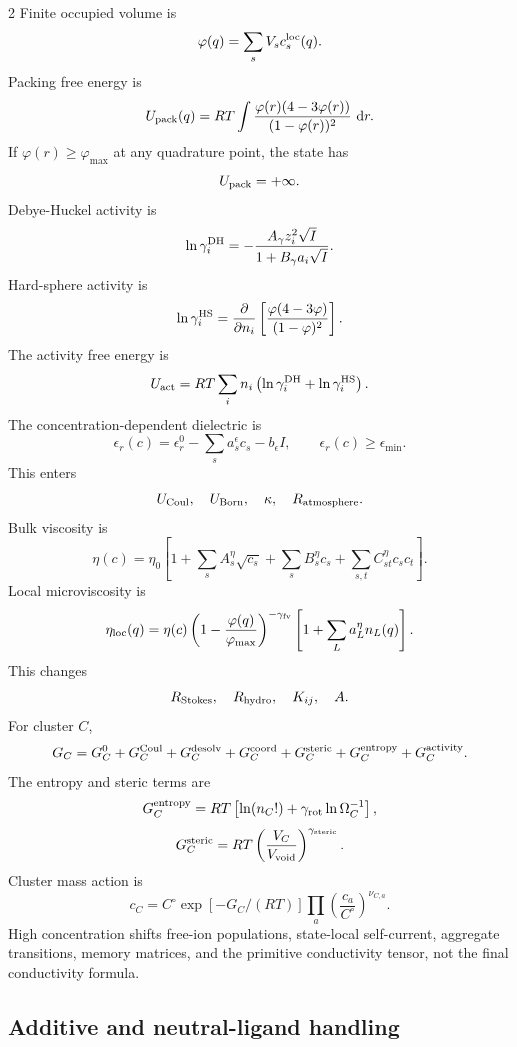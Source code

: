 \documentclass[10pt]{article}
\newcommand{\dd}{\,\mathrm d}
\begin{document}
\begin{multicols}{2}
Finite occupied volume is
\[
\varphi(q)=\sum_sV_sc_s^{\rm loc}(q).
\]
Packing free energy is
\[
U_{\rm pack}(q)
=
RT\int
\frac{\varphi(r)(4-3\varphi(r))}
{(1-\varphi(r))^2}
\,\dd r.
\]
If \(\varphi(r)\ge\varphi_{\max}\) at any quadrature point, the state has
\[
U_{\rm pack}=+\infty.
\]
Debye-Huckel activity is
\[
\ln\gamma_i^{\rm DH}
=
-\frac{A_\gamma z_i^2\sqrt I}
{1+B_\gamma a_i\sqrt I}.
\]
Hard-sphere activity is
\[
\ln\gamma_i^{\rm HS}
=
\frac{\partial}{\partial n_i}
\left[
\frac{\varphi(4-3\varphi)}{(1-\varphi)^2}
\right].
\]
The activity free energy is
\[
U_{\rm act}
=
RT\sum_i n_i
\left(
\ln\gamma_i^{\rm DH}
+\ln\gamma_i^{\rm HS}
\right).
\]
The concentration-dependent dielectric is
\[
\epsilon_r(c)
=
\epsilon_r^0-\sum_sa_s^\epsilon c_s-b_\epsilon I,
\qquad
\epsilon_r(c)\ge\epsilon_{\min}.
\]
This enters
\[
U_{\rm Coul},\quad U_{\rm Born},\quad \kappa,\quad R_{\rm atmosphere}.
\]
Bulk viscosity is
\[
\eta(c)
=
\eta_0
\left[
1+\sum_sA_s^\eta\sqrt{c_s}
+\sum_sB_s^\eta c_s
+\sum_{s,t}C_{st}^\eta c_sc_t
\right].
\]
Local microviscosity is
\[
\eta_{\rm loc}(q)
=
\eta(c)
\left(1-\frac{\varphi(q)}{\varphi_{\max}}\right)^{-\gamma_{\rm fv}}
\left[
1+\sum_La_L^\eta n_L(q)
\right].
\]
This changes
\[
R_{\rm Stokes},\quad R_{\rm hydro},\quad K_{ij},\quad A.
\]
For cluster \(C\),
\[
G_C=
G_C^0+G_C^{\rm Coul}+G_C^{\rm desolv}
+G_C^{\rm coord}+G_C^{\rm steric}
+G_C^{\rm entropy}+G_C^{\rm activity}.
\]
The entropy and steric terms are
\[
G_C^{\rm entropy}
=
RT\left[\ln(n_C!)+\gamma_{\rm rot}\ln\Omega_C^{-1}\right],
\]
\[
G_C^{\rm steric}
=
RT\left(\frac{V_C}{V_{\rm void}}\right)^{\gamma_{\rm steric}}.
\]
Cluster mass action is
\[
c_C
=
C^\circ
\exp[-G_C/(RT)]
\prod_a\left(\frac{c_a}{C^\circ}\right)^{\nu_{C,a}}.
\]
High concentration shifts free-ion populations, state-local self-current,
aggregate transitions, memory matrices, and the primitive conductivity tensor,
not the final conductivity formula.

\subsection{Additive and neutral-ligand handling}


\end{multicols}
\end{document}
